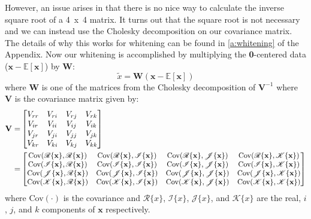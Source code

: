 \documentclass[14pt,a4paper]{article}
\begin{document}
However, an issue arises in that there is no nice way to calculate the inverse square root of a 4~x~4 matrix.
It turns out that the square root is not necessary and we can instead use the Cholesky decomposition on our covariance matrix.
The details of why this works for whitening can be found in \ref{a:whitening} of the Appendix.
Now our whitening is accomplished by multiplying the \textbf{0}-centered data ($\textbf{x} - \mathbb{E}[\textbf{x}]$) by \textbf{W}:
\begin{equation}
\tilde{x} = \textbf{W}(\textbf{x} - \mathbb{E}[\textbf{x}])
\label{eq:white4d}
\end{equation}
where \textbf{W} is one of the matrices from the Cholesky decomposition of $\textbf{V}^{-1}$ where \textbf{V} is the covariance matrix given by:
\begin{align}
\textbf{V}
=&
\begin{bmatrix}
 V_{rr} & V_{ri} & V_{rj} & V_{rk} \\
 V_{ir} & V_{ii} & V_{ij} & V_{ik} \\
 V_{jr} & V_{ji} & V_{jj} & V_{jk} \\
 V_{kr} & V_{ki} & V_{kj} & V_{kk}
\end{bmatrix} \nonumber \\
=& \small
\begin{bmatrix}
\mbox{Cov}(\mathscr{R}\{\textbf{x}\}, \mathscr{R}\{\textbf{x}\}) & \mbox{Cov}(\mathscr{R}\{\textbf{x}\}, \mathscr{I}\{\textbf{x}\}) & \mbox{Cov}(\mathscr{R}\{\textbf{x}\}, \mathscr{J}\{\textbf{x}\}) & \mbox{Cov}(\mathscr{R}\{\textbf{x}\}, \mathscr{K}\{\textbf{x}\}) \\
\mbox{Cov}(\mathscr{I}\{\textbf{x}\}, \mathscr{R}\{\textbf{x}\}) & \mbox{Cov}(\mathscr{I}\{\textbf{x}\}, \mathscr{I}\{\textbf{x}\}) & \mbox{Cov}(\mathscr{I}\{\textbf{x}\}, \mathscr{J}\{\textbf{x}\}) & \mbox{Cov}(\mathscr{I}\{\textbf{x}\}, \mathscr{K}\{\textbf{x}\}) \\
\mbox{Cov}(\mathscr{J}\{\textbf{x}\}, \mathscr{R}\{\textbf{x}\}) & \mbox{Cov}(\mathscr{J}\{\textbf{x}\}, \mathscr{I}\{\textbf{x}\}) & \mbox{Cov}(\mathscr{J}\{\textbf{x}\}, \mathscr{J}\{\textbf{x}\}) & \mbox{Cov}(\mathscr{J}\{\textbf{x}\}, \mathscr{K}\{\textbf{x}\}) \\
\mbox{Cov}(\mathscr{K}\{\textbf{x}\}, \mathscr{R}\{\textbf{x}\}) & \mbox{Cov}(\mathscr{K}\{\textbf{x}\}, \mathscr{I}\{\textbf{x}\}) & \mbox{Cov}(\mathscr{K}\{\textbf{x}\}, \mathscr{J}\{\textbf{x}\}) & \mbox{Cov}(\mathscr{K}\{\textbf{x}\}, \mathscr{K}\{\textbf{x}\}) \\
\end{bmatrix}
\label{eq:V4d}
\end{align}
where Cov$(\cdot)$ is the covariance and $\mathscr{R}\{x\}$, $\mathscr{I}\{x\}$, $\mathscr{J}\{x\}$, and $\mathscr{K}\{x\}$ are the real, $i$, $j$, and $k$ components of $\textbf{x}$ respectively.
\end{document}
